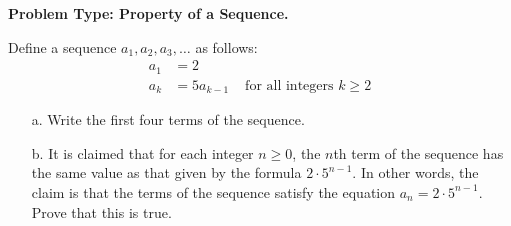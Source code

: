 \documentclass{article}
\newenvironment{problem}[1]{
    \begin{mdframed}[backgroundcolor=gray!20, skipabove=\baselineskip, skipbelow=\baselineskip, nobreak=true, innerleftmargin=10pt, innerrightmargin=10pt, innertopmargin=10pt, innerbottommargin=10pt]
    \textbf{Problem #1.}
}{
    \end{mdframed}
}
\begin{document}
        \begin{problem}{Type: Property of a Sequence}
            Define a sequence $a_1, a_2, a_3, \ldots$ as follows:
            \begin{align*}
                a_1 &= 2 \\
                a_k &= 5a_{k-1} & \text{ for all integers } k \geq 2
            \end{align*}
            \begin{enumerate}
                \item[a.] Write the first four terms of the sequence.
                \item[b.] It is claimed that for each integer $n \geq 0$, the $n$th term of the sequence has the same value as that given by the formula $2 \cdot 5^{n-1}$. In other words, the claim is that the terms of the sequence satisfy the equation $a_n = 2 \cdot 5^{n-1}$. Prove that this is true.
            \end{enumerate}
        \end{problem}
\end{document}
